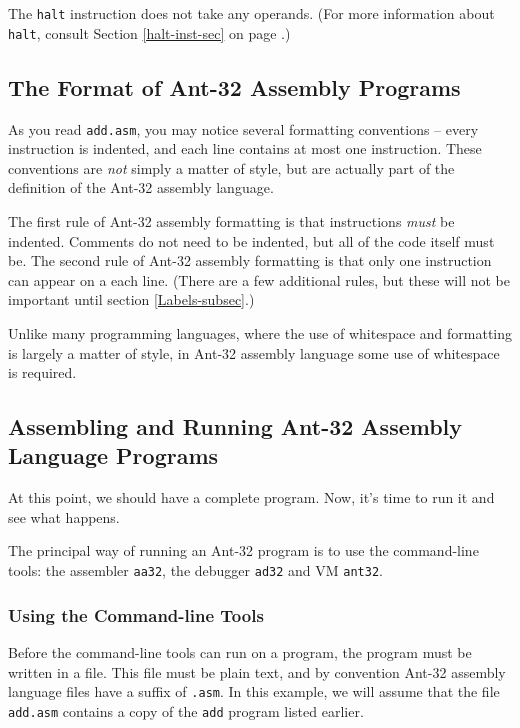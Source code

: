 The {\tt halt} instruction does not take any operands.  (For more
information about {\tt halt}, consult Section \ref{halt-inst-sec} on
page \pageref{halt-inst-sec}.)



\subsection{The Format of Ant-32 Assembly Programs}

As you read {\tt add.asm}, you may notice several formatting
conventions -- every instruction is indented, and each line contains at
most one instruction.  These conventions are {\em not} simply a matter
of style, but are actually part of the definition of the Ant-32
assembly language.

The first rule of Ant-32 assembly formatting is that
instructions {\em must} be indented.  Comments do not need to be
indented, but all of the code itself must be.  The second rule of
Ant-32 assembly formatting is that only one instruction can appear on
a each line.  (There are a few additional rules, but these will not be
important until section \ref{Labels-subsec}.)

Unlike many programming languages, where the use of whitespace and
formatting is largely a matter of style, in Ant-32 assembly
language some use of whitespace is required.

\subsection{Assembling and Running Ant-32 Assembly Language Programs}

At this point, we should have a complete program.  Now, it's time to
run it and see what happens.

The principal way of running an Ant-32 program is to use the
command-line tools:  the assembler {\tt aa32}, the debugger {\tt ad32}
and VM {\tt ant32}.

\subsubsection{Using the Command-line Tools}

Before the command-line tools can run on a program, the program must be
written in a file.  This file must be plain text, and by convention
Ant-32 assembly language files have a suffix of {\tt .asm}.  In
this example, we will assume that the file {\tt add.asm} contains a
copy of the {\tt add} program listed earlier.

